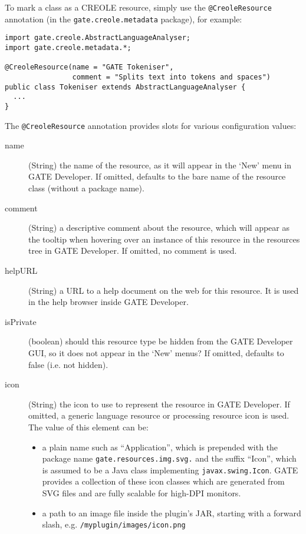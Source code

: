 To mark a class as a CREOLE resource, simply use the \verb|@CreoleResource|
annotation (in the {\tt gate.creole.metadata} package), for example:

\begin{lstlisting}
import gate.creole.AbstractLanguageAnalyser;
import gate.creole.metadata.*;

@CreoleResource(name = "GATE Tokeniser",
                comment = "Splits text into tokens and spaces")
public class Tokeniser extends AbstractLanguageAnalyser {
  ...
}
\end{lstlisting}

The \verb|@CreoleResource| annotation provides slots for various configuration
values:
\begin{description}
\item[name] (String) the name of the resource, as it will appear in the `New'
  menu in GATE Developer.  If omitted, defaults to the bare name of the resource
  class (without a package name).
\item[comment] (String) a descriptive comment about the resource, which will
  appear as the tooltip when hovering over an instance of this
  resource in the resources tree in GATE Developer.  If omitted, no
  comment is used.
\item[helpURL] (String) a URL to a help document on the web for this
  resource. It is used in the help browser inside GATE Developer.
\item[isPrivate] (boolean) should this resource type be hidden from the GATE Developer GUI, so
  it does not appear in the `New' menus?  If omitted, defaults to
  false (i.e.  not hidden).
\item[icon] (String) the icon to use to represent the resource in GATE Developer.
  If omitted, a generic language resource or processing resource icon
  is used. The value of this element can be:
  \begin{itemize}
  \item a plain name such as ``Application'', which is prepended with the
    package name {\tt gate.resources.img.svg.} and the suffix ``Icon'', which is
    assumed to be a Java class implementing {\tt javax.swing.Icon}.  GATE
    provides a collection of these icon classes which are generated from SVG
    files and are fully scalable for high-DPI monitors.
  \item a path to an image file inside the plugin's JAR, starting with a
    forward slash, e.g. \verb|/myplugin/images/icon.png|
  \end{itemize}

\end{description}
